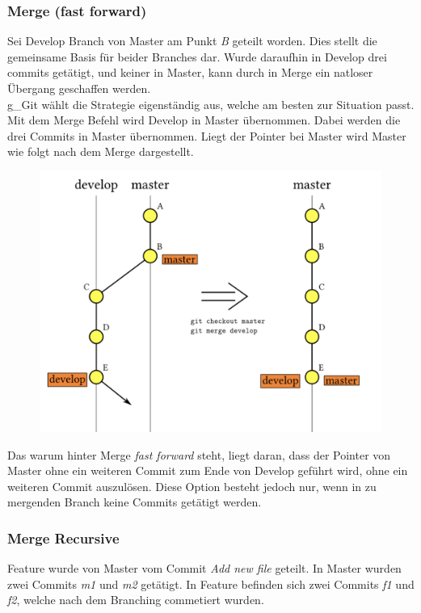 \subsubsection{Merge (fast forward)}
Sei Develop Branch von Master am Punkt \textit{B} geteilt worden. Dies stellt die gemeinsame Basis für beider Branches dar.
Wurde daraufhin in Develop drei commits getätigt, und keiner in Master, kann durch in Merge ein natloser Übergang geschaffen werden.\\
\Gls{g_Git} wählt die Strategie eigenständig aus, welche am besten zur Situation passt.\\

Mit dem Merge Befehl wird Develop in Master übernommen. Dabei werden die drei Commits in Master übernommen. Liegt der Pointer bei Master wird Master wie folgt nach dem Merge dargestellt.
\begin{figure}[H]
	\centering
	\includegraphics[width=0.7\linewidth]{attachment/chapter_5/Scc016}
\end{figure}

Das warum hinter Merge \textit{fast forward} steht, liegt daran, dass der Pointer von Master ohne ein weiteren Commit zum Ende von Develop geführt wird, ohne ein weiteren Commit auszulösen. Diese Option besteht jedoch nur, wenn in zu mergenden Branch keine Commits getätigt werden.

\subsubsection{Merge Recursive}
Feature wurde von Master vom Commit \textit{Add new file} geteilt. In Master wurden zwei Commits \textit{m1} und \textit{m2} getätigt. In Feature befinden sich zwei Commits \textit{f1} und \textit{f2}, welche nach dem Branching commetiert wurden.\\

